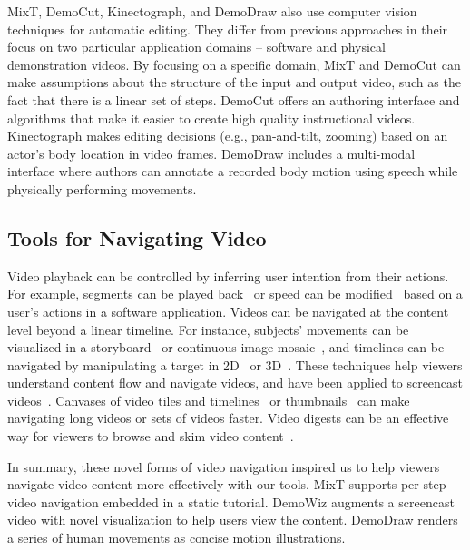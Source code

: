 MixT, DemoCut, Kinectograph, and DemoDraw also use computer vision techniques for automatic editing. They differ from previous approaches in their focus on two particular application domains -- software and physical demonstration videos.
%
By focusing on a specific domain, MixT and DemoCut can make assumptions about the structure of the input and output video, such as the fact that there is a linear set of steps. DemoCut offers an authoring interface and algorithms that make it easier to create high quality instructional videos.
%
Kinectograph makes editing decisions (e.g., pan-and-tilt, zooming) based on an actor's body location in video frames.
%
DemoDraw includes a multi-modal interface where authors can annotate a recorded body motion using speech while physically performing movements.



\subsection{Tools for Navigating Video}
Video playback can be controlled by inferring user intention from their actions. For example, segments can be played back~\cite{Pongnumkul:2011ju} or speed can be modified~\cite{Cheng:2009:SUV:1518701.1518823} based on a user's actions in a software application.
%
Videos can be navigated at the content level beyond a linear timeline. For instance, subjects' movements can be visualized in a storyboard~\cite{goldman2006schematic} or continuous image mosaic~\cite{Teodosio:2005:SS:1047936.1047940}, and timelines can be navigated by manipulating a target in 2D~\cite{Dragicevic:2008:VBD:1357054.1357096,Goldman:2008:VOA:1449715.1449719,Karrer:2008:DDM:1357054.1357097} or 3D~\cite{Nguyen:2013:DMV:2470654.2466150}.
%
These techniques help viewers understand content flow and navigate videos, and have been applied to screencast videos~\cite{Denoue:2013:RDM:2451176.2451190,Nguyen:2015:MST:2702123.2702209}.
%
Canvases of video tiles and timelines~\cite{Al-Hajri:2014:VPH:2611105.2557106} or thumbnails~\cite{Matejka:2013:SIO:2470654.2466149} can make navigating long videos or sets of videos faster. Video digests can be an effective way for viewers to browse and skim video content~\cite{Pavel:2014:VDB:2642918.2647400}.

In summary, these novel forms of video navigation inspired us to help viewers navigate video content more effectively with our tools.
%
MixT supports per-step video navigation embedded in a static tutorial.
%
DemoWiz augments a screencast video with novel visualization to help users view the content.
%
DemoDraw renders a series of human movements as concise motion illustrations.

